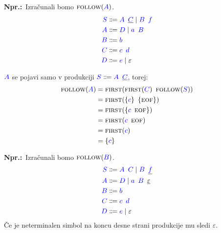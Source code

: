 \documentclass{article}
\newcommand{\Ex}{\textbf{Npr.:}\ }
\newcommand{\FIRST}{\textsc{first}}
\newcommand{\FOLLOW}{\textsc{follow}}
\newcommand{\EOF}{\textsc{eof}}
\newcommand{\Symbol}[1]{\textcolor{blue}{#1}}
\newcommand{\Null}{\varepsilon}
\newcommand{\Arrow}{\Coloneq}
\newcommand{\Seq}{{\ \,}}
\newcommand{\Union}{\mathrel{|}}
\begin{document}
\Ex Izračunali bomo $\FOLLOW(\Symbol{A})$.
\begin{equation*}
  \begin{aligned}
    \Symbol{S} &\Arrow \Symbol{A} \Seq \underline{\Symbol{C}} \Union \Symbol{B} \Seq \Symbol{f} \\
    \Symbol{A} &\Arrow \Symbol{D} \Union \Symbol{a} \Seq \Symbol{B} \\
    \Symbol{B} &\Arrow \Symbol{b}\\
    \Symbol{C} &\Arrow \Symbol{c} \Seq \Symbol{d}\\
    \Symbol{D} &\Arrow \Symbol{e} \Union \Null
  \end{aligned}
\end{equation*}

$\Symbol{A}$ se pojavi samo v produkciji $\Symbol{S} \Arrow \Symbol{A} \Seq \underline{\Symbol{C}}$, torej:
\begin{align*}
  \FOLLOW(\Symbol{A}) &= \FIRST(\FIRST(\Symbol{C}) \Seq \FOLLOW(\Symbol{S})) \\
             &= \FIRST(\{\Symbol{c}\} \Seq \{\EOF\})\\
             &= \FIRST(\{\Symbol{c} \Seq \EOF\})\\
             &= \FIRST(\Symbol{c} \Seq \EOF) \\
             &= \FIRST(\Symbol{c}) \\
             &= \{\Symbol{c}\}
\end{align*}

\Ex Izračunali bomo $\FOLLOW(\Symbol{B})$.
\begin{equation*}
  \begin{aligned}
    \Symbol{S} &\Arrow \Symbol{A} \Seq \Symbol{C} \Union \Symbol{B} \Seq \underline{\Symbol{f}} \\
    \Symbol{A} &\Arrow \Symbol{D} \Union \Symbol{a} \Seq \Symbol{B} \Seq \underline{\Null} \\
    \Symbol{B} &\Arrow \Symbol{b}\\
    \Symbol{C} &\Arrow \Symbol{c} \Seq \Symbol{d}\\
    \Symbol{D} &\Arrow \Symbol{e} \Union \Null
  \end{aligned}
\end{equation*}
Če je neterminalen simbol na koncu desne strani produkcije mu sledi $\Null$.
\end{document}
